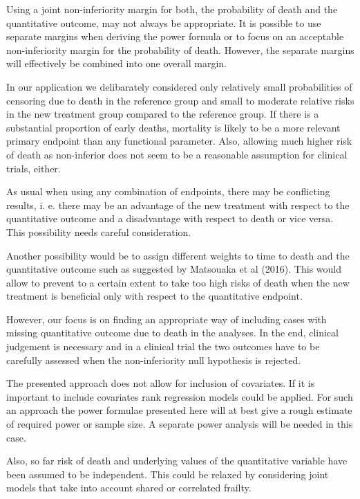 \documentclass[bimj,fleqn]{w-art}\usepackage[]{graphicx}\usepackage[]{color}
\theoremstyle{plain}
\theoremstyle{definition}
\begin{document}
Using a joint non-inferiority margin for both, the probability of death and the
quantitative outcome, may not always be appropriate. It is possible to use
separate margins when deriving the power formula or to focus on an acceptable
non-inferiority margin for the probability of death. However, the separate margins
will effectively be combined into one overall margin.

In our application we delibarately considered only relatively small probabilities
of censoring due to death in the reference group and small to moderate relative
risks in the new treatment group compared to the reference group. If there is a
substantial proportion of early deaths, mortality is likely to be a more relevant
primary endpoint than any functional parameter. Also, allowing much higher risk
of death as non-inferior does not seem to be a reasonable assumption for clinical
trials, either.

As usual when using any combination of endpoints, there may be conflicting
results, i. e. there may be an advantage of the new treatment with respect to
the quantitative outcome and a disadvantage with respect to death or vice versa.
This possibility needs careful consideration.

Another possibility would be to assign different weights to time to death and
the quantitative outcome such as suggested by Matsouaka et al (2016). This would
allow to prevent to a certain extent to take too high risks of death when the
new treatment is beneficial only with respect to the quantitative endpoint.

However, our focus is on finding an appropriate way of including cases with
missing quantitative outcome due to death in the analyses. In the end, clinical
judgement is necessary and in a clinical trial the two outcomes have to be
carefully assessed when the non-inferiority null hypothesis is rejected.

The presented approach does not allow for inclusion of covariates. If it is
important to include covariates rank regression models could be applied.
For such an approach the power formulae presented here will at best give a rough
estimate of required power or sample size. A separate power analysis will be
needed in this case.

Also, so far risk of death and underlying values of the quantitative variable
have been assumed to be independent. This could be relaxed by considering joint
models that take into account shared or correlated frailty.
\end{document}
